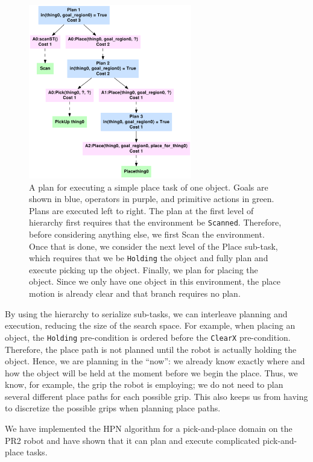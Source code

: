 \documentclass[letterpaper, 10 pt, conference]{ieeeconf}  %
\begin{document}
\begin{figure}
\centering
\includegraphics[height=3in]{images/pr2.pdf}
\caption{A plan for executing a simple place task of one object.
  Goals are shown in blue, operators in purple, and primitive actions
  in green.  Plans are executed left to right.  The plan at the
  first level of 
hierarchy first requires that the environment be {\tt Scanned}.
Therefore,
before considering anything else, we first {\sc Scan} the
environment.  Once that is done, we consider the next level of the
{\sc Place} sub-task, which requires that we be {\tt Holding} the
object and
fully plan and execute picking up the object.  Finally, we plan
for placing
the object.  Since we only have one object in this
environment, the place motion is already clear and that branch
requires no plan.}
\label{fig:hierarchy}
\end{figure}


By using the hierarchy to serialize sub-tasks, we can interleave
planning and execution, reducing the size of the search space.  For
example, when placing an object, the {\tt Holding} pre-condition is
ordered before the {\tt ClearX} pre-condition.  Therefore, the place path
is not planned until the robot is actually holding the
object.  Hence, we are planning in the
``now'': we already know exactly where and how the object will be held
at the moment before we begin the place.  Thus, we
know, for example, the grip the robot is employing; we do not need
to plan several different place paths for each possible grip.
This also keeps us from having to
discretize the possible grips when planning place paths.

We have implemented the HPN algorithm for a pick-and-place domain on
the
PR2 robot and have shown that it can plan and execute complicated
pick-and-place tasks.
\end{document}
